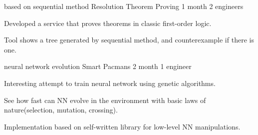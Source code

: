 
\begin{cventries}


  \cventry
    {based on sequential method}
    {Resolution Theorem Proving}
    {1 month}
    {2 engineers}
    {
      \begin{cvitems}
        \item {Developed a service that proves theorems in classic first-order logic.}
        \item {Tool shows a tree generated by sequential method, and counterexample if there is one.}
      \end{cvitems}
    }
  \cventry
    {neural network evolution}
    {Smart Pacmans}
    {2 month}
    {1 engineer}
    {
      \begin{cvitems}
        \item {Interesting attempt to train neural network using genetic algorithms.}
        \item {See how fast can NN evolve in the environment with basic laws of nature(selection, mutation, crossing).}
        \item {Implementation based on self-written library for low-level NN manipulations.}
      \end{cvitems}
    }
\end{cventries}
